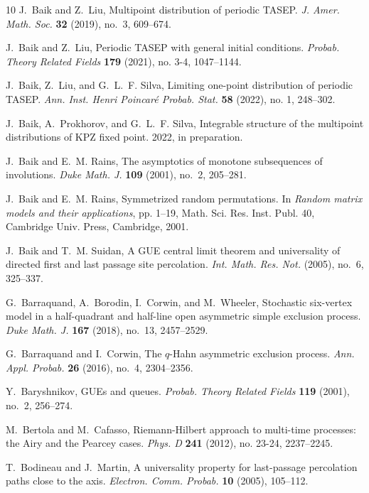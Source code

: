 \documentclass[10pt]{article}
\theoremstyle{plain}
\theoremstyle{definition}
\numberwithin{equation}{section}
\begin{document}
\begin{thebibliography}{10}
J.~Baik and Z.~Liu, Multipoint distribution of periodic {TASEP}. \emph{J. Amer.
  Math. Soc.} \textbf{32} (2019), no.~3, 609--674.

J.~Baik and Z.~Liu, Periodic {TASEP} with general initial conditions.
  \emph{Probab. Theory Related Fields} \textbf{179} (2021), no. 3-4,
  1047--1144.

J.~Baik, Z.~Liu, and G.~L.~F. Silva, Limiting one-point distribution of
  periodic {TASEP}. 
 \emph{Ann. Inst. Henri Poincar\'{e} Probab. Stat.} \textbf{58} (2022), no. 1,
  248--302. 

J.~Baik, A.~Prokhorov, and G.~L.~F. Silva, Integrable structure of the
  multipoint distributions of {KPZ} fixed point. 2022, in preparation.

J.~Baik and E.~M. Rains, The asymptotics of monotone subsequences of
  involutions. \emph{Duke Math. J.} \textbf{109} (2001), no.~2, 205--281.

J.~Baik and E.~M. Rains, Symmetrized random permutations. In \emph{Random
  matrix models and their applications}, pp. 1--19, Math. Sci. Res. Inst. Publ.
  40, Cambridge Univ. Press, Cambridge, 2001.

J.~Baik and T.~M. Suidan, A {GUE} central limit theorem and universality of
  directed first and last passage site percolation. \emph{Int. Math. Res. Not.}
   (2005), no.~6, 325--337.

G.~Barraquand, A.~Borodin, I.~Corwin, and M.~Wheeler, Stochastic six-vertex
  model in a half-quadrant and half-line open asymmetric simple exclusion
  process. \emph{Duke Math. J.} \textbf{167} (2018), no.~13, 2457--2529.

G.~Barraquand and I.~Corwin, The {$q$}-{H}ahn asymmetric exclusion process.
  \emph{Ann. Appl. Probab.} \textbf{26} (2016), no.~4, 2304--2356.

Y.~Baryshnikov, G{UE}s and queues. \emph{Probab. Theory Related Fields}
  \textbf{119} (2001), no.~2, 256--274.

M.~Bertola and M.~Cafasso, Riemann-{H}ilbert approach to multi-time processes:
  the {A}iry and the {P}earcey cases. \emph{Phys. D} \textbf{241} (2012), no.
  23-24, 2237--2245.

T.~Bodineau and J.~Martin, A universality property for last-passage percolation
  paths close to the axis. \emph{Electron. Comm. Probab.} \textbf{10} (2005),
  105--112.


\end{thebibliography}
\end{document}
